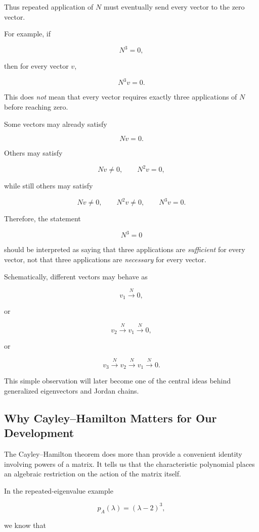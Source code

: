 \documentclass[11pt]{article}
\begin{document}
Thus repeated application of \(N\) must eventually send every vector
to the zero vector.

For example, if

\[
N^3=0,
\]

then for every vector \(v\),

\[
N^3v=0.
\]

This does \emph{not} mean that every vector requires exactly three
applications of \(N\) before reaching zero.

Some vectors may already satisfy

\[
Nv=0.
\]

Others may satisfy

\[
Nv\neq0,
\qquad
N^2v=0,
\]

while still others may satisfy

\[
Nv\neq0,
\qquad
N^2v\neq0,
\qquad
N^3v=0.
\]

Therefore, the statement

\[
N^3=0
\]

should be interpreted as saying that three applications are
\emph{sufficient} for every vector, not that three applications are
\emph{necessary} for every vector.

Schematically, different vectors may behave as

\[
v_1
\xrightarrow{\,N\,}
0,
\]

or

\[
v_2
\xrightarrow{\,N\,}
v_1
\xrightarrow{\,N\,}
0,
\]

or

\[
v_3
\xrightarrow{\,N\,}
v_2
\xrightarrow{\,N\,}
v_1
\xrightarrow{\,N\,}
0.
\]

This simple observation will later become one of the central ideas
behind generalized eigenvectors and Jordan chains.

\subsection{Why Cayley--Hamilton Matters for Our Development}

The Cayley--Hamilton theorem does more than provide a convenient
identity involving powers of a matrix.  It tells us that the
characteristic polynomial places an algebraic restriction on the
action of the matrix itself.

In the repeated-eigenvalue example

\[
p_A(\lambda)=(\lambda-2)^3,
\]

we know that
\end{document}
